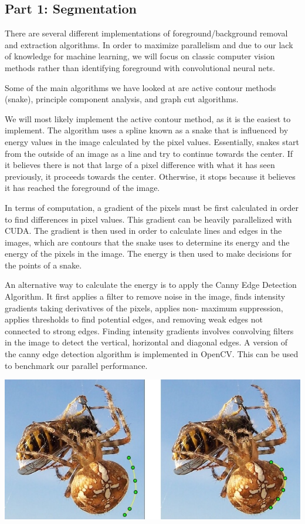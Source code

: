 \documentclass[12pt]{article}
\begin{document}
\subsection{Part 1: Segmentation}

There are several different implementations of foreground/background removal
and extraction algorithms. In order to maximize parallelism and due to our lack
of knowledge for machine learning, we will focus on classic computer vision
methods rather than identifying foreground with convolutional neural nets.
\cite{pixel-ml}

Some of the main algorithms we have looked at are active contour methods
(snake), principle component analysis, and graph cut algorithms.

We will most likely implement the active contour method, as it is the easiest
to implement. The algorithm uses a spline known as a snake that is influenced
by energy values in the image calculated by the pixel values. Essentially,
snakes start from the outside of an image as a line and try to continue towards
the center. If it believes there is not that large of a pixel difference with
what it has seen previously, it proceeds towards the center. Otherwise, it
stops because it believes it has reached the foreground of the image.

In terms of computation, a gradient of the pixels must be first calculated in
order to find differences in pixel values. This gradient can be heavily
parallelized with CUDA. The gradient is then used in order to calculate lines
and edges in the images, which are contours that the snake uses to determine
its energy and the energy of the pixels in the image. The energy is then used
to make decisions for the points of a snake.

An alternative way to calculate the energy is to apply the Canny Edge Detection
Algorithm. \cite{canny-edge} It first applies a filter to remove noise in the
image, finds intensity gradients taking derivatives of the pixels, applies non-
maximum suppression, applies thresholds to find potential edges, and removing
weak edges not connected to strong edges. Finding intensity gradients involves
convolving filters in the image to detect the vertical, horizontal and diagonal
edges. A version of the canny edge detection algorithm is implemented in
OpenCV. \cite{canny-edge} This can be used to benchmark our parallel
performance.

\begin{center}
\includegraphics[scale=0.5]{snake-contour-example.jpg}
\cite{contour-model}
\end{center}
\end{document}
